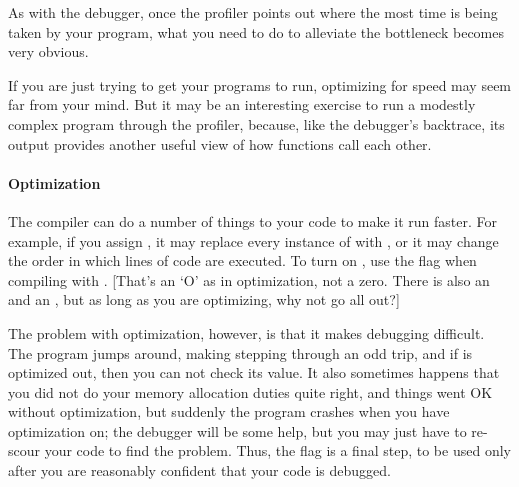 As with the debugger, once the profiler points out where the most time
is being taken by your program, what you need to do to alleviate the
bottleneck becomes very obvious.

If you are just trying to get your programs to run, optimizing for speed 
may seem far from your mind. But it may be an interesting exercise to
run a modestly complex program through the profiler, because, like the
debugger's backtrace, its output provides another useful view of how
functions call each other.



\paragraph{Optimization} 
The  compiler can do a number of things to your code to make it
run faster. For example, if you assign , it may replace
every instance of  with , or it may change the order
in which lines of code are executed. To turn on ,
use the  flag when compiling with . [That's an `O'
as in optimization, not a zero. There is also an  and an , but as long as you are optimizing, why not go all out?]

The problem with optimization, however, is that it makes debugging
difficult. The program jumps around, making stepping through an odd
trip, and if  is optimized out, then you can not check its value.
It also sometimes happens that you did not do your memory allocation duties
quite right, and things went OK without optimization, but suddenly the
program crashes when you have optimization on; the debugger will be some
help, but you may just have to re-scour your code to find the problem.
Thus, the  flag is a final step, to be used only after you
are reasonably confident that your code is debugged.

